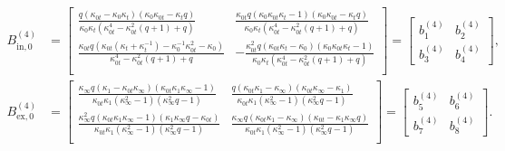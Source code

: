 \documentclass[a4paper,reqno,11pt]{amsart}
\numberwithin{equation}{section}
\numberwithin{figure}{section}
\theoremstyle{plain}
\theoremstyle{remark}
\numberwithin{rhp}{section}
\begin{document}
\begin{equation}\label{val:B2inout0}
\begin{split}
    B_{\text{in},0}^{(4)} &= \begin{bmatrix}
 \frac{q (\kappa_{0t}-\kappa_{0} \kappa_{t}) (\kappa_{0} \kappa_{0t}-\kappa_{t} q)}{\kappa_{0} \kappa_{t} \left(\kappa_{0t}^4-\kappa_{0t}^2 (q+1)+q\right)} & \frac{\kappa_{0t} q (\kappa_{0} \kappa_{0t} \kappa_{t}-1) (\kappa_{0} \kappa_{0t}-\kappa_{t} q)}{\kappa_{0} \kappa_{t} \left(\kappa_{0t}^4-\kappa_{0t}^2 (q+1)+q\right)} \\
 \frac{\kappa_{0t} q (\kappa_{0t} (\kappa_{t}+\kappa_{t}^{-1})-\kappa_{0}^{-1}\kappa_{0t}^2-\kappa_{0})}{\kappa_{0t}^4-\kappa_{0t}^2 (q+1)+q} & -\frac{\kappa_{0t}^2 q (\kappa_{0t} \kappa_{t}-\kappa_{0}) (\kappa_{0} \kappa_{0t} \kappa_{t}-1)}{\kappa_{0} \kappa_{t} \left(\kappa_{0t}^4-\kappa_{0t}^2 (q+1)+q\right)} \\
\end{bmatrix} = \begin{bmatrix}
       b^{(4)}_1  & b_2^{(4)} \\
        b_3^{(4)} & b_4^{(4)} 
    \end{bmatrix},\\
     B_{\text{ex},0}^{(4)}&= \begin{bmatrix}
 \frac{\kappa_{\infty} q (\kappa_{1}-\kappa_{0t} \kappa_{\infty}) (\kappa_{0t} \kappa_{1} \kappa_{\infty}-1)}{\kappa_{0t} \kappa_{1} \left(\kappa_{\infty}^2-1\right) \left(\kappa_{\infty}^2 q-1\right)} & \frac{q (\kappa_{0t} \kappa_{1}-\kappa_{\infty}) (\kappa_{0t} \kappa_{\infty}-\kappa_{1})}{\kappa_{0t} \kappa_{1} \left(\kappa_{\infty}^2-1\right) \left(\kappa_{\infty}^2 q-1\right)} \\
 \frac{\kappa_{\infty}^2 q (\kappa_{0t} \kappa_{1} \kappa_{\infty}-1) (\kappa_{1} \kappa_{\infty} q-\kappa_{0t})}{\kappa_{0t} \kappa_{1} \left(\kappa_{\infty}^2-1\right) \left(\kappa_{\infty}^2 q-1\right)} & \frac{\kappa_{\infty} q (\kappa_{0t} \kappa_{1}-\kappa_{\infty}) (\kappa_{0t}-\kappa_{1} \kappa_{\infty} q)}{\kappa_{0t} \kappa_{1} \left(\kappa_{\infty}^2-1\right) \left(\kappa_{\infty}^2 q-1\right)} \\
\end{bmatrix} = \begin{bmatrix}
       b_5^{(4)}  & b_6^{(4)} \\
        b_7^{(4)} & b_8^{(4)} 
    \end{bmatrix}.
\end{split}
\end{equation}
\end{document}
